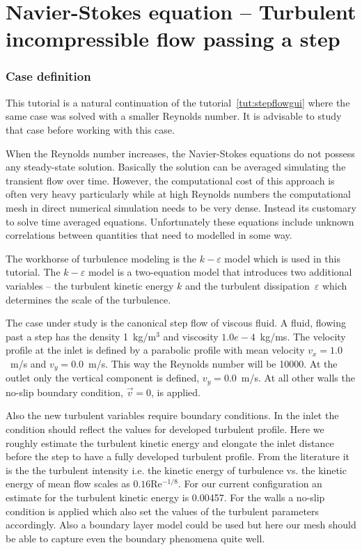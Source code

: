 \chapter{Navier-Stokes equation -- Turbulent incompressible flow passing a step}
\label{tut:stepflowke}




\subsection*{Case definition}

This tutorial is a natural continuation of the tutorial~\ref{tut:stepflowgui}
where the same case was solved with a smaller Reynolds number. It is advisable 
to study that case before working with this case. 

When the Reynolds number increases, the 
Navier-Stokes equations do not possess any steady-state 
solution. Basically the solution can be averaged simulating the transient 
flow over time. However, the computational cost of this approach is often very 
heavy particularly while at high Reynolds numbers the computational mesh
in direct numerical simulation needs to be very dense. Instead its customary
to solve time averaged equations. Unfortunately these equations include 
unknown correlations between quantities that need to modelled in some way.

The workhorse of turbulence modeling is the $k-\varepsilon$ model which 
is used in this tutorial. The $k-\varepsilon$ model is a two-equation model
that introduces two additional variables -- the turbulent kinetic energy $k$ and the 
turbulent dissipation~$\varepsilon$
which determines the scale of the turbulence.

The case under study is the canonical step flow of viscous fluid. 
A fluid, flowing past a step has the density
1~kg/m$^3$ and viscosity $1.0e-4$~kg/ms. The velocity profile at the inlet is
defined by a parabolic profile with mean velocity 
$v_x=1.0$~m/s and $v_y=0.0$~m/s. 
This way the Reynolds number will be 10000.
At the outlet only 
the vertical component is defined, $v_y=0.0$~m/s. At all other
walls the no-slip boundary condition, $\vec{v}=0$, is applied. 

Also the new turbulent variables require boundary conditions. 
In the inlet the condition should reflect the values for developed turbulent
profile. Here we roughly estimate the turbulent kinetic energy and 
elongate the inlet distance before the step 
to have a fully developed turbulent profile. 
From the literature it is the the turbulent intensity i.e. the 
kinetic energy of turbulence vs. the kinetic energy of mean flow 
scales as $0.16$Re$^{-1/8}$. For our current configuration an estimate for the 
turbulent kinetic energy is 0.00457. 
For the walls a no-slip condition is applied which also set the values of the
turbulent parameters accordingly. Also a boundary layer model could be used but here
our mesh should be able to capture even the boundary phenomena quite well. 

